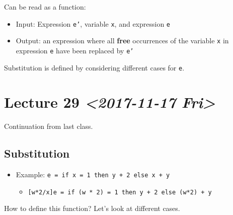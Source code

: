 \documentclass[11pt]{article}
\begin{document}
Can be read as a function:
\begin{itemize}
\item Input: Expression \texttt{e'}, variable \texttt{x}, and expression \texttt{e}
\item Output: an expression where all \textbf{free} occurrences of the variable \texttt{x} in expression \texttt{e} have been replaced by \texttt{e'}
\end{itemize}
Substitution is defined by considering different cases for \texttt{e}.
\section{Lecture 29 \textit{<2017-11-17 Fri>}}
\label{sec:org62eb62f}
Continuation from last class.
\subsection{Substitution}
\label{sec:org33be073}
\begin{itemize}
\item Example: \texttt{e = if x = 1 then y + 2 else x + y}
\begin{itemize}
\item \texttt{[w*2/x]e = if (w * 2) = 1 then y + 2 else (w*2) + y}
\end{itemize}
\end{itemize}
How to define this function? Let's look at different cases.
\end{document}
